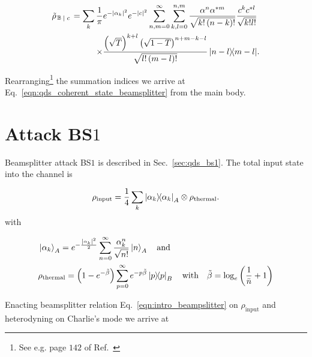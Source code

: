 \begin{align}
\tilde{\rho}_{\left. \mathbb{B} \given c \right.} = \sum_k \frac{1}{\pi} e^{-\left|\alpha_k\right|^2}  e^{-\left|c\right|^2} \sum_{n, m = 0}^\infty \sum_{k, l = 0}^{n, m} \frac{\alpha^n \alpha^{* m}}{\sqrt{k! \left(n - k\right)!}} \frac{c^k c^{* l}}{\sqrt{k! l!}}& \notag \\
%
\times\frac{\left(\sqrt{T}\right)^{k+l} \left(\sqrt{1-T}\right)^{n + m - k - l}}{\sqrt{l! \left(m-l\right)!}} \dyad{n-l}{m-l}&.
\end{align}

\noindent Rearranging\footnote{See e.g. page $142$ of Ref.~\cite{GerryandKnight}} the summation indices we arrive at Eq.~\ref{eqn:qds_coherent_state_beamsplitter} from the main body.

\section{Attack BS$1$}\label{appendix:bs1}
Beamsplitter attack BS$1$ is described in Sec.~\ref{sec:qds_bs1}. The total input state into the channel is 

\begin{equation}\label{eqn:qds_bs1_input_state}
\rho_{\text{input}} = \frac{1}{4}\sum_k \dyad{\alpha_k}_A \otimes \rho_{\text{thermal}}.
\end{equation}
with 

\begin{align}
&\ket{\alpha_k}_A = e^{- \frac{\left| \alpha_k \right|^2}{2}} \sum_{n=0}^\infty \frac{\alpha_k^n}{\sqrt{n!}} \ket{n}_A \qq{and}\notag \\
&\rho_{\text{thermal}} = \left(1 - e^{-\tilde{\beta}}\right) \sum_{p=0}^\infty e^{- p \tilde{\beta}}\dyad{p}_B \qq{with} \tilde{\beta} = \log_e\left(\frac{1}{\bar{n}} +1\right)
\end{align}



\noindent Enacting beamsplitter relation Eq.~\ref{eqn:intro_beampslitter} on $\rho_{\text{input}}$ and heterodyning on Charlie's mode we arrive at %

